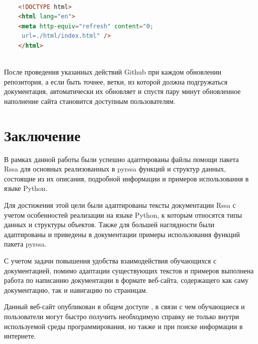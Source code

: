\documentclass[specialist,
			   substylefile = spbu_report.rtx,
			   subf,href,colorlinks=true, 12pt]{disser}
\begin{document}
\begin{lstlisting}[language=HTML, caption=Содержимое переадресующего файла index.html.]
	
	<!DOCTYPE html>
	<html lang="en">
	<meta http-equiv="refresh" content="0;
	 url=./html/index.html" />
	</html>
	
\end{lstlisting}

После проведения указанных действий Github при каждом обновлении репозитория, а если быть точнее, ветки, из которой должна подгружаться документация, автоматически их обновляет и спустя пару минут обновленное наполнение сайта становится доступным пользователям.

\chapter{Заключение}

В рамках данной работы были успешно адаптированы файлы помощи пакета Rssa для основных реализованных в pyrssa функций и структур данных, состоящие из их описания, подробной информации и примеров использования в языке Python.

Для достижения этой цели были адаптированы тексты документации Rssa с учетом особенностей реализации на языке Python, к которым относятся типы данных и структуры объектов. Также для большей наглядности были адаптированы и приведены в документации примеры использования функций пакета pyrssa. 

С учетом задачи повышения удобства взаимодействия обучающихся с документацией, помимо адаптации существующих текстов и примеров выполнена работа по написанию документации в формате веб-сайта, содержащего как саму документацию, так и навигацию по страницам. 

Данный веб-сайт опубликован в общем доступе \cite{pyrrsa-doc}, в связи с чем обучающиеся и пользователи могут быстро получить необходимую справку не только внутри используемой среды программирования, но также и при поиске информации в интернете.

\printbibliography
{}
\end{document}
